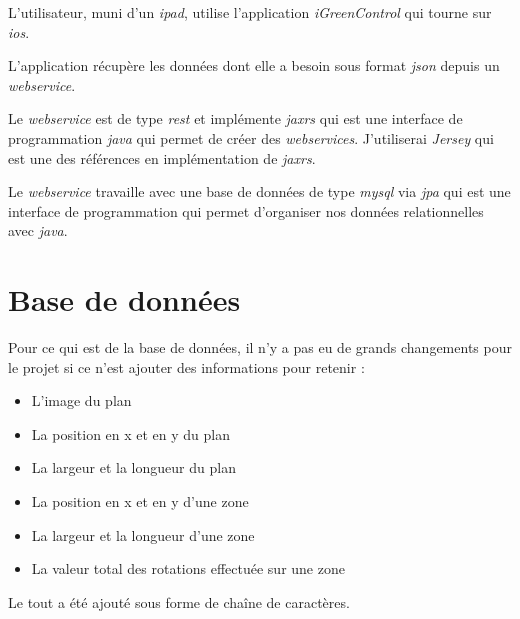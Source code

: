 L'utilisateur, muni d'un \emph{\gls{ipad}}, utilise l'application \emph{iGreenControl} qui tourne sur \emph{\gls{ios}}.

\medskip

L'application récupère les données dont elle a besoin sous format \emph{\gls{json}} depuis un \emph{\gls{webservice}}.

\medskip

Le \emph{\gls{webservice}} est de type \emph{\gls{rest}} et implémente \emph{\gls{jaxrs}} qui est une interface de programmation \emph{\gls{java}} qui permet de créer des \emph{\glspl{webservice}}. J'utiliserai \emph{Jersey} qui est une des références en implémentation de \emph{\gls{jaxrs}}.

\medskip

Le \emph{\gls{webservice}} travaille avec une base de données de type \emph{\gls{mysql}} via \emph{\gls{jpa}} qui est une interface de programmation qui permet d'organiser nos données relationnelles avec \emph{\gls{java}}.

\section{Base de données} %
\label{sec:base_de_donn_es}
Pour ce qui est de la base de données, il n'y a pas eu de grands changements pour le projet si ce n'est ajouter des informations pour retenir :

\medskip

\begin{itemize}
    \item L'image du plan
    \item La position en x et en y du plan
    \item La largeur et la longueur du plan
    \item La position en x et en y d'une zone
    \item La largeur et la longueur d'une zone
    \item La valeur total des rotations effectuée sur une zone
\end{itemize}

\medskip

Le tout a été ajouté sous forme de chaîne de caractères.
